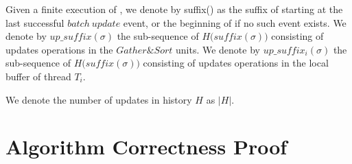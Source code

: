 \begin{definition} \label{Def: unprop_update}
Given a finite execution \s of \mysketch, we denote by suffix(\s) as the suffix of \s starting at the last successful $\mathit{batch\ update}$ event, or the beginning of \s if no such event exists.
We denote by $\mathit{up\_suffix}(\sigma)$ the sub-sequence of $\mathit{H(suffix}(\sigma))$ consisting of updates operations in the $Gather\&Sort$ units.
We denote by $\mathit{up\_suffix_i}(\sigma)$ the sub-sequence of $\mathit{H(suffix}(\sigma))$ consisting of updates operations in the local buffer of thread $T_i$.
\end{definition}

\begin{definition} \label{Def: updates_num}
We denote the number of updates in history $\mathit{H}$ as $\mathit{|H|}$.
\end{definition}


\section{Algorithm Correctness Proof}


